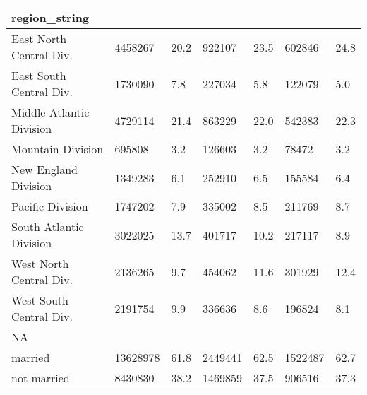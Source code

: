 \begin{longtable}{lllllll}
\midrule
\multicolumn{1}{l}{region\_string} \\ 
\midrule
East North Central Div. & 4458267 & 20.2 & 922107 & 23.5 & 602846 & 24.8 \\ 
East South Central Div. & 1730090 & 7.8 & 227034 & 5.8 & 122079 & 5.0 \\ 
Middle Atlantic Division & 4729114 & 21.4 & 863229 & 22.0 & 542383 & 22.3 \\ 
Mountain Division & 695808 & 3.2 & 126603 & 3.2 & 78472 & 3.2 \\ 
New England Division & 1349283 & 6.1 & 252910 & 6.5 & 155584 & 6.4 \\ 
Pacific Division & 1747202 & 7.9 & 335002 & 8.5 & 211769 & 8.7 \\ 
South Atlantic Division & 3022025 & 13.7 & 401717 & 10.2 & 217117 & 8.9 \\ 
West North Central Div. & 2136265 & 9.7 & 454062 & 11.6 & 301929 & 12.4 \\ 
West South Central Div. & 2191754 & 9.9 & 336636 & 8.6 & 196824 & 8.1 \\ 
\midrule
\multicolumn{1}{l}{NA} \\ 
\midrule
married & 13628978 & 61.8 & 2449441 & 62.5 & 1522487 & 62.7 \\ 
not married & 8430830 & 38.2 & 1469859 & 37.5 & 906516 & 37.3 \\ 
\bottomrule
\end{longtable}

